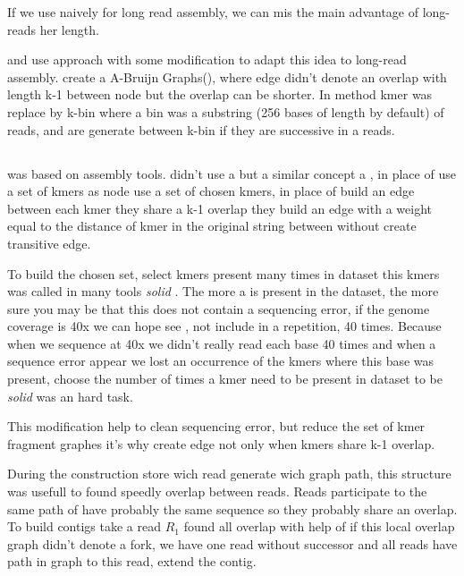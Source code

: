 \documentclass[main]{subfiles}
\begin{document}
If we use \DBG naively for long read assembly, we can mis the main advantage of long-reads her length.

\flye and \wtdbg use \DBG approach with some modification to adapt this idea to long-read assembly. \flye create a A-Bruijn Graphs(), where edge didn't denote an overlap with length k-1 between node but the overlap can be shorter. In \wtdbg method kmer was replace by k-bin where a bin was a substring (256 bases of length by default) of reads, and are generate between k-bin if they are successive in a reads.

\subsection{\flye}

\flye\cite{Flye} was based on \abruijn\cite{abruijn} assembly tools. \abruijn didn't use a \DBG but a similar concept a , in place of use a set of kmers as node  use a set of chosen kmers, in place of build an edge between each kmer they share a k-1 overlap they build an edge with a weight equal to the distance of kmer in the original string between without create transitive edge.

To build the chosen \kmers set, \abruijn select kmers present many times in dataset this kmers was called in many tools \textit{solid} \kmers {} . The more a \kmers is present in the dataset, the more sure you may be that this \kmers does not contain a sequencing error, if the genome coverage is 40x we can hope see \kmer, not include in a repetition, 40 times. Because when we sequence at 40x we didn't really read each base 40 times and when a sequence error appear we lost an occurrence of the kmers where this base was present, choose the number of times a kmer need to be present in dataset to be \textit{solid} was an hard task.

This modification help to clean sequencing error, but reduce the set of kmer fragment \DBG graphes it's why  create edge not only when kmers share k-1 overlap. 

During the  construction \abruijn store wich read generate wich graph path, this structure was usefull to found speedly overlap between reads. Reads participate to the same path of  have probably the same sequence so they probably share an overlap. To build contigs \abruijn take a read $R_1$ found all overlap with help of  if this local overlap graph didn't denote a fork, we have one read without successor and all reads have path in graph to this read, \abruijn extend the contig.
\end{document}
